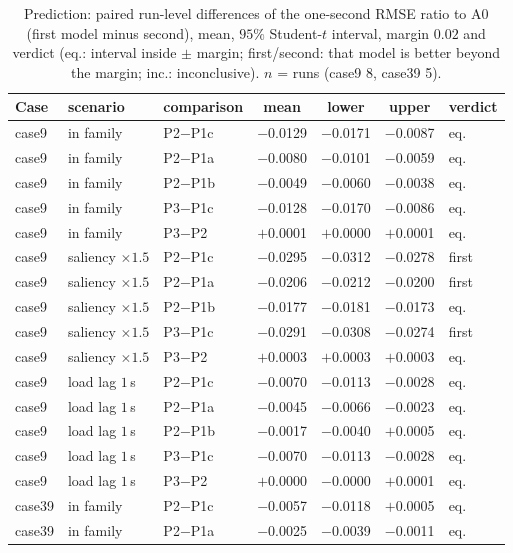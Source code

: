 \begin{table}[H]\centering\scriptsize
\caption{Prediction: paired run-level differences of the one-second RMSE ratio to A0 (first model minus second), mean, $95\%$ Student-$t$ interval, margin $0.02$ and verdict (eq.: interval inside $\pm$ margin; first/second: that model is better beyond the margin; inc.: inconclusive). $n$ = runs (case9 8, case39 5).}
\label{tab:S:predcomp}
\begin{tabular}{lllcccl}
\toprule
Case & scenario & comparison & mean & lower & upper & verdict\\
\midrule
case9 & in family & P2$-$P1c & $-$0.0129 & $-$0.0171 & $-$0.0087 & eq.\\
case9 & in family & P2$-$P1a & $-$0.0080 & $-$0.0101 & $-$0.0059 & eq.\\
case9 & in family & P2$-$P1b & $-$0.0049 & $-$0.0060 & $-$0.0038 & eq.\\
case9 & in family & P3$-$P1c & $-$0.0128 & $-$0.0170 & $-$0.0086 & eq.\\
case9 & in family & P3$-$P2 & $+$0.0001 & $+$0.0000 & $+$0.0001 & eq.\\
case9 & saliency $\times1.5$ & P2$-$P1c & $-$0.0295 & $-$0.0312 & $-$0.0278 & first\\
case9 & saliency $\times1.5$ & P2$-$P1a & $-$0.0206 & $-$0.0212 & $-$0.0200 & first\\
case9 & saliency $\times1.5$ & P2$-$P1b & $-$0.0177 & $-$0.0181 & $-$0.0173 & eq.\\
case9 & saliency $\times1.5$ & P3$-$P1c & $-$0.0291 & $-$0.0308 & $-$0.0274 & first\\
case9 & saliency $\times1.5$ & P3$-$P2 & $+$0.0003 & $+$0.0003 & $+$0.0003 & eq.\\
case9 & load lag $1$\,s & P2$-$P1c & $-$0.0070 & $-$0.0113 & $-$0.0028 & eq.\\
case9 & load lag $1$\,s & P2$-$P1a & $-$0.0045 & $-$0.0066 & $-$0.0023 & eq.\\
case9 & load lag $1$\,s & P2$-$P1b & $-$0.0017 & $-$0.0040 & $+$0.0005 & eq.\\
case9 & load lag $1$\,s & P3$-$P1c & $-$0.0070 & $-$0.0113 & $-$0.0028 & eq.\\
case9 & load lag $1$\,s & P3$-$P2 & $+$0.0000 & $-$0.0000 & $+$0.0001 & eq.\\
case39 & in family & P2$-$P1c & $-$0.0057 & $-$0.0118 & $+$0.0005 & eq.\\
case39 & in family & P2$-$P1a & $-$0.0025 & $-$0.0039 & $-$0.0011 & eq.\\

\end{tabular}
\end{table}
